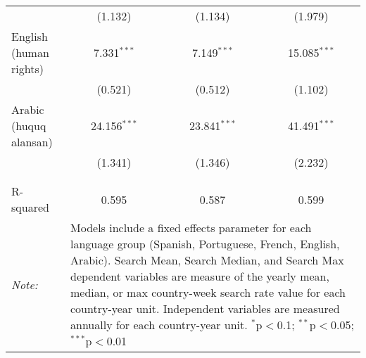 \begin{table}[!htbp]
\begin{tabular}{@{\extracolsep{5pt}}lccc}
  & (1.132) & (1.134) & (1.979) \\ 
  English (human rights) & 7.331$^{***}$ & 7.149$^{***}$ & 15.085$^{***}$ \\ 
  & (0.521) & (0.512) & (1.102) \\ 
  Arabic (huquq alansan) & 24.156$^{***}$ & 23.841$^{***}$ & 41.491$^{***}$ \\ 
  & (1.341) & (1.346) & (2.232) \\ 
 \hline \\[-1.8ex] 
\hline 
\hline \\[-1.8ex] 
R-squared  & 0.595 & 0.587 & 0.599 \\ 
\textit{Note:}  & \multicolumn{3}{l}{\parbox[t]{8cm}{Models include a fixed effects parameter for each language group (Spanish, Portuguese, French, English, Arabic). Search Mean, Search Median, and Search Max dependent variables are measure of the yearly mean, median, or max country-week search rate value for each country-year unit. Independent variables are measured annually for each country-year unit. $^{*}$p$<$0.1; $^{**}$p$<$0.05; $^{***}$p$<$0.01}} \\ 
\end{tabular} 
\end{table} 
